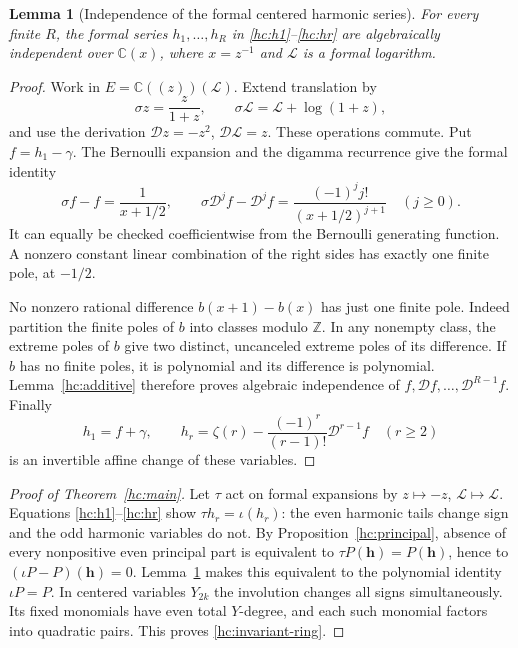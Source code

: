 \documentclass[11pt]{article}
\numberwithin{equation}{section}
\newtheorem{lemma}[theorem]{Lemma}
\theoremstyle{definition}
\theoremstyle{remark}
\begin{document}
\begin{lemma}[Independence of the formal centered harmonic series]
\label{hc:independence}
For every finite $R$, the formal series $h_1,\ldots,h_R$ in
\eqref{hc:h1}--\eqref{hc:hr} are algebraically independent over
$\mathbb C(x)$, where $x=z^{-1}$ and $\mathcal L$ is a formal logarithm.
\end{lemma}
\begin{proof}
Work in $E=\mathbb C((z))(\mathcal L)$. Extend translation by
\[
 \sigma z=\frac{z}{1+z},\qquad
 \sigma \mathcal L=\mathcal L+\log(1+z),
\]
and use the derivation $\mathcal D z=-z^2$, $\mathcal D \mathcal L=z$.
These operations commute. Put $f=h_1-\gamma$.
The Bernoulli expansion and the digamma recurrence give the formal
identity
\[
 \sigma f-f=\frac1{x+1/2},\qquad
 \sigma\mathcal D^j f-\mathcal D^j f
       =\frac{(-1)^j j!}{(x+1/2)^{j+1}}\quad(j\ge0).
\]
It can equally be checked coefficientwise from the Bernoulli
generating function. A nonzero constant linear combination of the
right sides has exactly one finite pole, at $-1/2$.

No nonzero rational difference $b(x+1)-b(x)$ has just one finite
pole. Indeed partition the finite poles of $b$ into classes modulo
$\mathbb Z$. In any nonempty class, the extreme poles of $b$ give
two distinct, uncanceled extreme poles of its difference. If $b$
has no finite poles, it is polynomial and its difference is
polynomial. Lemma~\ref{hc:additive} therefore proves algebraic
independence of $f,\mathcal Df,\ldots,\mathcal D^{R-1}f$.
Finally
\[
 h_1=f+\gamma,\qquad
 h_r=\zeta(r)-\frac{(-1)^r}{(r-1)!}\mathcal D^{r-1}f\quad(r\ge2)
\]
is an invertible affine change of these variables.
\end{proof}

\begin{proof}[Proof of Theorem~\ref{hc:main}]
Let $\tau$ act on formal expansions by $z\mapsto-z$, $\mathcal L\mapsto \mathcal L$.
Equations \eqref{hc:h1}--\eqref{hc:hr} show
$\tau h_r=\iota(h_r)$: the even harmonic tails change sign and
the odd harmonic variables do not. By
Proposition~\ref{hc:principal}, absence of every nonpositive even
principal part is equivalent to
$\tau P(\mathbf h)=P(\mathbf h)$, hence to
$(\iota P-P)(\mathbf h)=0$. Lemma~\ref{hc:independence} makes
this equivalent to the polynomial identity $\iota P=P$.
In centered variables $Y_{2k}$ the involution changes all signs
simultaneously. Its fixed monomials have even total $Y$-degree,
and each such monomial factors into quadratic pairs. This proves
\eqref{hc:invariant-ring}.
\end{proof}
\end{document}
